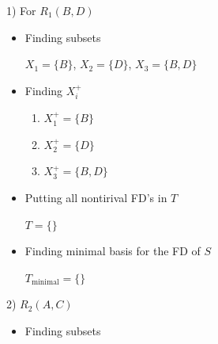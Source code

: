 \documentclass[12pt]{article}
\begin{document}
\begin{enumerate}[1.]
\begin{itemize}
\begin{itemize}
\begin{enumerate}[1.]
                1) \color{red}For $R_1(B,D)$\color{black}

                \bigskip

                \begin{itemize}
                    \item Finding subsets

                    \bigskip
                    \color{red}

                        $X_1 = \{B\}$,
                        $X_2 = \{D\}$,
                        $X_3 = \{B,D\}$

                    \color{black}
                    \bigskip

                    \item Finding $X_i^+$

                    \bigskip
                    \color{red}

                    \begin{enumerate}[1.]
                        \item $X_1^+ = \{B\}$
                        \item $X_2^+ = \{D\}$
                        \item $X_3^+ = \{B,D\}$
                    \end{enumerate}

                    \color{black}
                    \item Putting all nontirival FD's in $T$

                    \color{red}

                    $T = \{\}$

                    \color{black}

                    \item Finding minimal basis for the FD of $S$

                    \color{red}

                    $T_{\text{minimal}} = \{\}$

                    \color{black}

                \end{itemize}

                \bigskip

                2) \color{red}$R_2(A,C)$\color{black}

                \bigskip

                \begin{itemize}
                    \item Finding subsets


\end{itemize}
\end{enumerate}
\end{itemize}
\end{itemize}
\end{enumerate}
\end{document}
